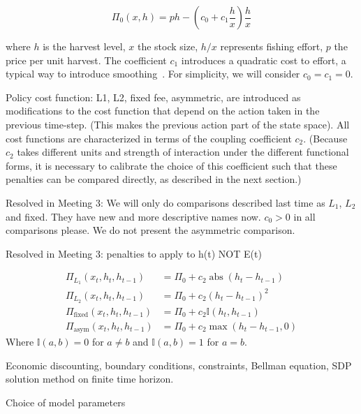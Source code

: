 \documentclass[authoryear, review, 12pt]{elsarticle}
\begin{document}
\begin{equation} 
\Pi_0(x,h) = p h - \left( c_0  + c_1 \frac{h}{x} \right) \frac{h}{x} \label{profit}
\end{equation}


where $h$ is the harvest level, $x$ the stock size, $h/x$ represents
fishing effort, $p$ the price per unit harvest.  The coefficient $c_1$
introduces a quadratic cost to effort, a typical way to introduce
smoothing~\citep[\emph{e.g.}][]{Singh2006}.  For simplicity, we will consider $c_0 = c_1 = 0$.

Policy cost function: L1, L2, fixed fee, asymmetric, are introduced
as modifications to the cost function that depend on the action
taken in the previous time-step.  (This makes the previous action part
of the state space).   All cost functions are characterized in terms
of the coupling coefficient $c_2$.  (Because $c_2$ takes different units
and strength of interaction under the different functional forms, it is
necessary to calibrate the choice of this coefficient such that these
penalties can be compared directly, as described in the next section.)

{\color{blue}
Resolved in Meeting 3: We will only do comparisons described last time as $L_1$, $L_2$ and fixed. They have new and more descriptive names now. $c_0>0$ in all comparisons please. We do not present the asymmetric comparison.
 
Resolved in Meeting 3: penalties to apply to h(t) NOT E(t)
}

  \begin{align} 
    \Pi_{L_1}(x_t,h_t, h_{t-1}) &= \Pi_0 + c_2 \operatorname{abs}\left( h_t - h_{t-1} \right) \label{L1} \\
    \Pi_{L_2}(x_t,h_t, h_{t-1}) &= \Pi_0 + c_2 \left( h_t - h_{t-1} \right)^2 \label{L2} \\
    \Pi_{\textrm{fixed}}(x_t,h_t, h_{t-1}) &= \Pi_0 + c_2 \mathbb{I}(h_t, h_{t-1})  \label{fixed_fee} \\
    \Pi_{\textrm{asym}}(x_t,h_t, h_{t-1}) &= \Pi_0 + c_2 \operatorname{max}\left( h_t - h_{t-1}, 0 \right) \label{asym}
  \end{align}
  Where $\mathbb{I}(a,b) = 0$ for $a \neq b$ and  $\mathbb{I}(a,b) = 1$ for $a = b$.  

 Economic discounting, boundary conditions, constraints, Bellman equation, SDP solution method on finite time horizon.  

  
Choice of model parameters 
\end{document}
